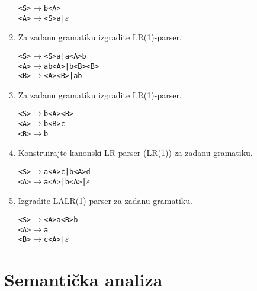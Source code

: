 \documentclass[times, 12pt, utf8]{book}
\begin{document}
\begin{enumerate}[resume]
\begin{alltt}
<S> \(\to\) b<A>
<A> \(\to\) <S>a | \(\varepsilon\)
\end{alltt}

\item
Za zadanu gramatiku izgradite LR(1)-parser. \cite[str.~139-147]{udzbenik} \cite{auditorne}

\begin{alltt}
<S> \(\to\) <S>a | a<A>b
<A> \(\to\) ab<A> | b<B><B>
<B> \(\to\) <A><B> | ab
\end{alltt}

\item
Za zadanu gramatiku izgradite LR(1)-parser. \cite[str.~139-147]{udzbenik} \cite{auditorne}

\begin{alltt}
<S> \(\to\) b<A><B>
<A> \(\to\) b<B>c
<B> \(\to\) b
\end{alltt}

\item
Konstruirajte kanonski LR-parser (LR(1)) za zadanu gramatiku. \cite[str.~139-147]{udzbenik} \cite{auditorne}

\begin{alltt}
<S> \(\to\) a<A>c | b<A>d
<A> \(\to\) a<A> | b<A> | \(\varepsilon\)
\end{alltt} 

\item
Izgradite LALR(1)-parser za zadanu gramatiku.  \cite[str.~155-156]{udzbenik}

\begin{alltt}
<S> \(\to\) <A>a<B>b
<A> \(\to\) a
<B> \(\to\) c<A> | \(\varepsilon\)
\end{alltt}

\end{enumerate}


\chapter{Semantička analiza}

\end{document}
